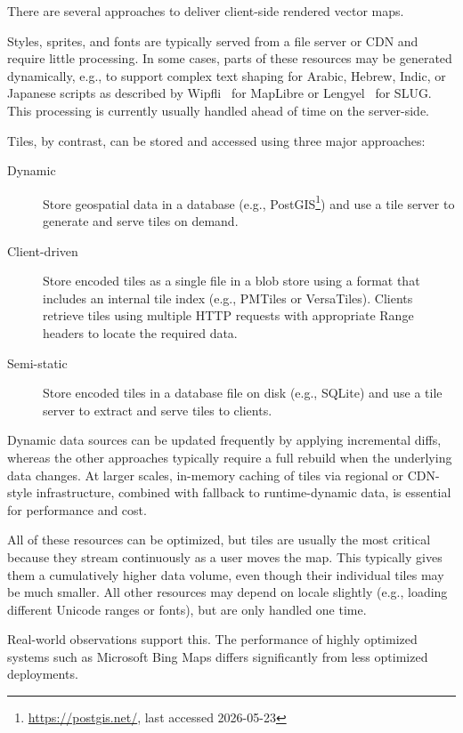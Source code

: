 There are several approaches to deliver client-side rendered vector maps.

Styles, sprites, and fonts are typically served from a file server or \ac{CDN} and require little processing.
In some cases, parts of these resources may be generated dynamically, e.g., to support complex text shaping for Arabic, Hebrew, Indic, or Japanese scripts as described by Wipfli~\cite{wipfliComplexTextPlugin2025} for MapLibre or Lengyel~\cite{lengelDecadeSlug} for SLUG.
This processing is currently usually handled ahead of time on the server-side.

Tiles, by contrast, can be stored and accessed using three major approaches:

\begin{description}
\item[Dynamic]
    Store geospatial data in a database (e.g., PostGIS\footnote{\url{https://postgis.net/}, last accessed 2026-05-23}) and use a tile server to generate and serve tiles on demand.
\item[Client-driven]
    Store encoded tiles as a single file in a blob store using a format that includes an internal tile index (e.g., PMTiles or VersaTiles).
    Clients retrieve tiles using multiple \ac{HTTP} requests with appropriate Range headers to locate the required data.
\item[Semi-static]
    Store encoded tiles in a database file on disk (e.g., SQLite) and use a tile server to extract and serve tiles to clients.
\end{description}

Dynamic data sources can be updated frequently by applying incremental diffs, whereas the other approaches typically require a full rebuild when the underlying data changes.
At larger scales, in-memory caching of tiles via regional or \ac{CDN}-style infrastructure, combined with fallback to runtime-dynamic data, is essential for performance and cost.

All of these resources can be optimized, but tiles are usually the most critical because they stream continuously as a user moves the map.
This typically gives them a cumulatively higher data volume, even though their individual tiles may be much smaller.
All other resources may depend on locale slightly (e.g., loading different Unicode ranges or fonts), but are only handled one time.

Real-world observations support this.
The performance of highly optimized systems such as Microsoft Bing Maps differs significantly from less optimized deployments.


